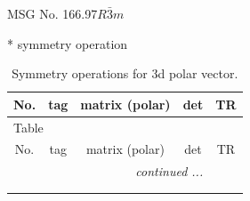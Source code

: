 \documentclass[fleqn,8pt]{jsarticle}
\begin{document}
\setcounter{MaxMatrixCols}{32}

\renewcommand{\tablename}{Table~}
\renewcommand{\figurename}{Figure~}
\begin{center}
\LARGE
MSG No. 166.97\quad$R\bar{3}m$
\end{center}
* symmetry operation
\renewcommand{\arraystretch}{1.3}
\begin{longtable}{ccccc}
\caption{Symmetry operations for 3d polar vector.}
 \\
 \hline \hline
No. & tag & matrix (polar) & det & TR \\ \hline \endfirsthead

\multicolumn{4}{l}{\tablename\ \thetable{}} \\
 \hline \hline
No. & tag & matrix (polar) & det & TR \\ \hline \endhead

 \hline \hline
\multicolumn{4}{r}{\footnotesize\it continued ...} \\ \endfoot

 \hline \hline
\multicolumn{4}{r}{} \\ \endlastfoot


\end{longtable}
\end{document}
